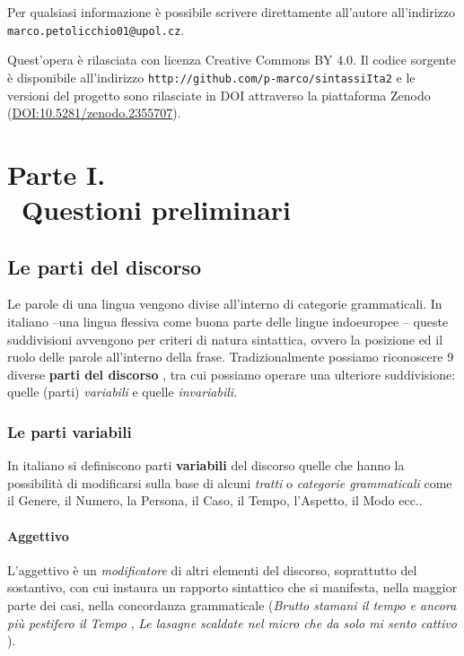 \documentclass[a4paper,twoside,11pt,chapterprefix=false,bibliography=totocnumbered,listof=flat]{scrbook}
\begin{document}
Per qualsiasi informazione è possibile scrivere direttamente all'autore
all'indirizzo \texttt{marco.petolicchio01@upol.cz}.

Quest'opera è rilasciata con licenza Creative Commons BY 4.0. Il codice
sorgente è disponibile all'indirizzo
\texttt{http://github.com/p-marco/sintassiIta2} e le versioni del
progetto sono rilasciate in DOI attraverso la piattaforma Zenodo
(\url{DOI:10.5281/zenodo.2355707}).

\mainmatter

\part*{Parte I. \\\ Questioni preliminari}

\chapter{Le parti del discorso}\label{le-parti-del-discorso}

Le parole di una lingua vengono divise all'interno di categorie
grammaticali. In italiano --una lingua flessiva come buona parte delle
lingue indoeuropee \citep{graffiScalise2009}-- queste suddivisioni
avvengono per criteri di natura sintattica, ovvero la posizione ed il
ruolo delle parole all'interno della frase. Tradizionalmente possiamo
riconoscere 9 diverse \textbf{parti del discorso} \citep{salvi2013}, tra
cui possiamo operare una ulteriore suddivisione: quelle (parti)
\emph{variabili} e quelle \emph{invariabili}.

\section{Le parti variabili}\label{le-parti-variabili}

In italiano si definiscono parti \textbf{variabili} del discorso quelle
che hanno la possibilità di modificarsi sulla base di alcuni
\emph{tratti} o \emph{categorie grammaticali} \citep[ Cap.9]{simone1995}
come il Genere, il Numero, la Persona, il Caso, il Tempo, l'Aspetto, il
Modo ecc..

\subsection{Aggettivo}\label{aggettivo}

L'aggettivo è un \emph{modificatore} di altri elementi del discorso,
soprattutto del sostantivo, con cui instaura un rapporto sintattico che
si manifesta, nella maggior parte dei casi, nella concordanza
grammaticale (\emph{Brutto stamani il tempo e ancora più pestifero il
Tempo} \citep{montale-satura}, \emph{Le lasagne scaldate nel micro che
da solo mi sento cattivo} \citep{fibra2017}).
\end{document}
